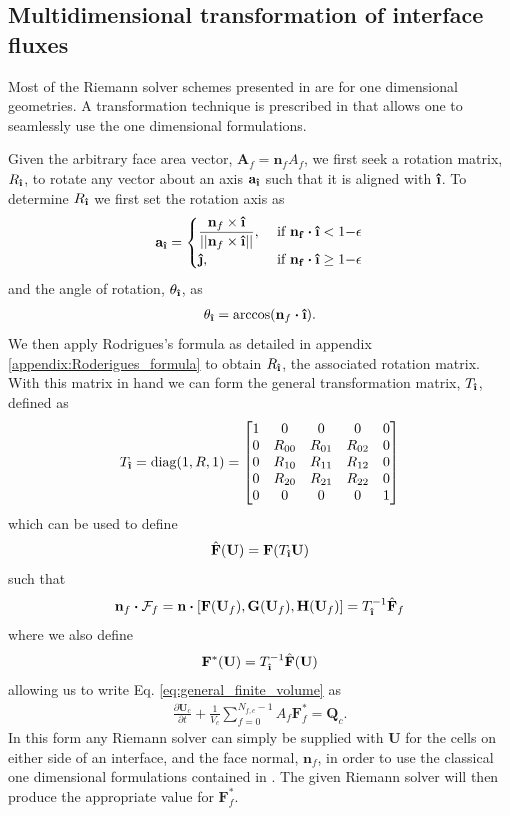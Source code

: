 \documentclass[10pt,letterpaper,notitlepage]{article}
\numberwithin{equation}{section}
\newcommand{\partialderiv}[2]{\frac{\partial #1}{\partial #2}}
\newcommand{\dotp}{\boldsymbol{\cdot}}
\newcommand{\uvec}[1]{\boldsymbol{\hat{\textbf{#1}}}}
\newcommand{\ihat}{\uvec{\i}}
\newcommand{\jhat}{\uvec{\j}}
\newcommand{\hatbf}[1]{\hat{\mathbf{#1}}}
\newcommand{\beqn}{\begin{equation}\begin{aligned}}
\newcommand{\eeqn}{\end{aligned}\end{equation}}
\begin{document}
\vspace{1cm}
\subsection{Multidimensional transformation of interface fluxes} \label{section:3dtransformation}
Most of the Riemann solver schemes presented in \cite{Toro} are for one dimensional geometries. A transformation technique is prescribed in \cite{Toro} that allows one to seamlessly use the one dimensional formulations.

Given the arbitrary face area vector, $\mathbf{A}_f=\mathbf{n}_f A_f$, we first seek a rotation matrix, $R_{\ihat}$, to rotate any vector about an axis $\mathbf{a}_{\ihat}$ such that it is aligned with $\ihat$. To determine $R_{\ihat}$ we first set the rotation axis as
\beqn 
\mathbf{a}_{\ihat} = 
\begin{cases}
\dfrac{\mathbf{n}_f \times \ihat}{||\mathbf{n}_f \times \ihat||}, &\text{ if } \mathbf{n_f}\dotp \ihat < 1{-}\epsilon \\
\jhat, &\text{ if } \mathbf{n_f}\dotp \ihat \ge 1{-}\epsilon
\end{cases}
\eeqn 
and the angle of rotation, $\theta_{\ihat}$, as
\beqn 
\theta_{\ihat} = \arccos (\mathbf{n}_f \dotp \ihat).
\eeqn 
We then apply Rodrigues's formula as detailed in appendix \ref{appendix:Roderigues_formula} to obtain $R_{\ihat}$, the associated rotation matrix. With this matrix in hand we can form the general transformation matrix, $T_{\ihat}$, defined as
\beqn
T_{\ihat} = \text{diag}(1,R,1) = 
\begin{bmatrix}
1 & 0         & 0         & 0         & 0 \\
0 & R_{00} & R_{01} & R_{02} & 0 \\
0 & R_{10} & R_{11} & R_{12} & 0 \\
0 & R_{20} & R_{21} & R_{22} & 0 \\
0 & 0         & 0         & 0         & 1 \\
\end{bmatrix}
\eeqn
which can be used to define 
\beqn 
\hatbf{F} (\mathbf{U})= \mathbf{F}(T_{\ihat} \mathbf{U})
\eeqn 
such that
\beqn 
\mathbf{n}_f \dotp \mathcal{F}_f
= \mathbf{n} \dotp [
\mathbf{F}(\mathbf{U}_f),
\mathbf{G}(\mathbf{U}_f),
\mathbf{H}(\mathbf{U}_f)]
=
T_{\ihat}^{-1} \hatbf{F}_f
\eeqn 
where we also define
\beqn 
\mathbf{F}^*(\mathbf{U}) = T_{\ihat}^{-1} \hatbf{F} (\mathbf{U})
\eeqn 
allowing us to write Eq. \eqref{eq:general_finite_volume} as 
\beqn 
\partialderiv{\mathbf{U}_c}{t} 
+ 
\frac{1}{V_c}
\sum_{f=0}^{N_{f,c}{-}1} 
A_f  \mathbf{F}_f^*
=  \mathbf{Q}_c.
\eeqn 
In this form any Riemann solver can simply be supplied with $\mathbf{U}$ for the cells on either side of an interface, and the face normal, $\mathbf{n}_f$, in order to use the classical one dimensional formulations contained in \cite{Toro}. The given Riemann solver will then produce the appropriate value for $\mathbf{F}_f^*$.
\end{document}
